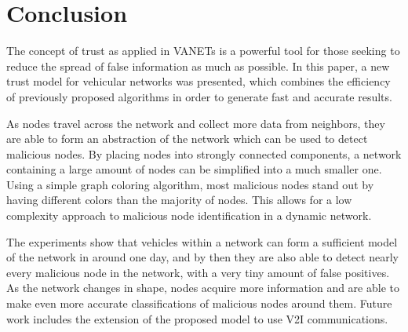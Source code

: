 \chapter{Conclusion}
\label{chap:conclusion}

The concept of trust as applied in VANETs is a powerful tool for those seeking to reduce the spread of false information as much as possible.
In this paper, a new trust model for vehicular networks was presented, which combines the efficiency of previously proposed algorithms in order to generate fast and accurate results.

As nodes travel across the network and collect more data from neighbors, they are able to form an abstraction of the network which can be used to detect malicious nodes.
By placing nodes into strongly connected components, a network containing a large amount of nodes can be simplified into a much smaller one.
Using a simple graph coloring algorithm, most malicious nodes stand out by having different colors than the majority of nodes.
This allows for a low complexity approach to malicious node identification in a dynamic network.

The experiments show that vehicles within a network can form a sufficient model of the network in around one day, and by then they are also able to detect nearly every malicious node in the network, with a very tiny amount of false positives.
As the network changes in shape, nodes acquire more information and are able to make even more accurate classifications of malicious nodes around them. Future work includes the extension of the proposed model to use V2I communications.
